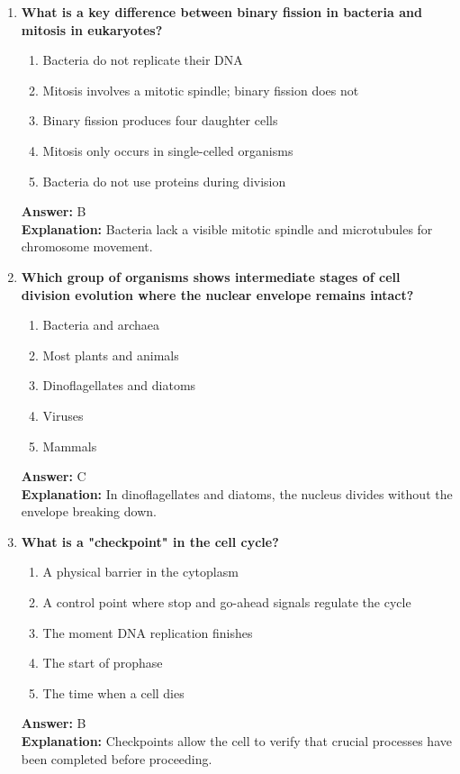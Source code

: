 \documentclass[11pt, a4paper]{article}
\begin{document}
\begin{enumerate}[leftmargin=*, label=\arabic*.]
\item \textbf{What is a key difference between binary fission in bacteria and mitosis in eukaryotes?}
\begin{enumerate}[label=\Alph*.]
\item Bacteria do not replicate their DNA
\item Mitosis involves a mitotic spindle; binary fission does not
\item Binary fission produces four daughter cells
\item Mitosis only occurs in single-celled organisms
\item Bacteria do not use proteins during division
\end{enumerate}
\textbf{Answer:} B \\
\textbf{Explanation:} Bacteria lack a visible mitotic spindle and microtubules for chromosome movement.

\item \textbf{Which group of organisms shows intermediate stages of cell division evolution where the nuclear envelope remains intact?}
\begin{enumerate}[label=\Alph*.]
\item Bacteria and archaea
\item Most plants and animals
\item Dinoflagellates and diatoms
\item Viruses
\item Mammals
\end{enumerate}
\textbf{Answer:} C \\
\textbf{Explanation:} In dinoflagellates and diatoms, the nucleus divides without the envelope breaking down.

\item \textbf{What is a "checkpoint" in the cell cycle?}
\begin{enumerate}[label=\Alph*.]
\item A physical barrier in the cytoplasm
\item A control point where stop and go-ahead signals regulate the cycle
\item The moment DNA replication finishes
\item The start of prophase
\item The time when a cell dies
\end{enumerate}
\textbf{Answer:} B \\
\textbf{Explanation:} Checkpoints allow the cell to verify that crucial processes have been completed before proceeding.


\end{enumerate}
\end{document}
